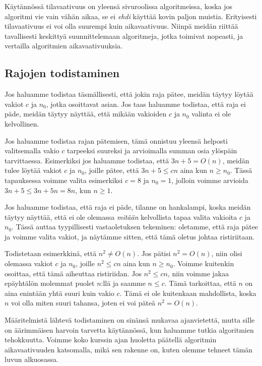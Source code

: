 Käytännössä tilavaativuus on yleensä sivuroolissa algoritmeissa,
koska jos algoritmi vie vain vähän aikaa, se ei \emph{ehdi} käyttää kovin paljon muistia.
Erityisesti tilavaativuus ei voi olla suurempi kuin aikavaativuus.
Niinpä meidän riittää tavallisesti keskittyä suunnittelemaan algoritmeja,
jotka toimivat nopeasti, ja vertailla algoritmien aikavaativuuksia.

\subsection{Rajojen todistaminen}

Jos haluamme todistaa täsmällisesti, että jokin raja pätee,
meidän täytyy löytää vakiot $c$ ja $n_0$, jotka osoittavat asian.
Jos taas haluamme todistaa, että raja ei päde,
meidän täytyy näyttää, että mikään vakioiden $c$ ja $n_0$ valinta ei ole kelvollinen.

Jos haluamme todistaa rajan pätemisen,
tämä onnistuu yleensä helposti valitsemalla vakio $c$
tarpeeksi suureksi ja arvioimalla summan osia ylöspäin tarvittaessa.
Esimerkiksi jos haluamme todistaa, että $3n+5 = O(n)$, meidän tulee löytää
vakiot $c$ ja $n_0$, joille pätee, että $3n+5 \le cn$ aina kun $n \ge n_0$.
Tässä tapauksessa voimme valita esimerkiksi $c=8$ ja $n_0=1$,
jolloin voimme arvioida $3n+5 \le 3n+5n=8n$, kun $n \ge 1$.

Jos haluamme todistaa, että raja ei päde, tilanne on hankalampi,
koska meidän täytyy näyttää, että ei ole olemassa \emph{mitään} kelvollista
tapaa valita vakioita $c$ ja $n_0$.
Tässä auttaa tyypillisesti vastaoletuksen tekeminen: oletamme,
että raja pätee ja voimme valita vakiot,
ja näytämme sitten, että tämä oletus johtaa ristiriitaan.

Todistetaan esimerkkinä, että $n^2 \neq O(n)$.
Jos pätisi $n^2=O(n)$, niin olisi olemassa vakiot $c$ ja $n_0$,
joille $n^2 \le cn$ aina kun $n \ge n_0$.
Voimme kuitenkin osoittaa, että tämä aiheuttaa ristiriidan.
Jos $n^2 \le cn$, niin voimme jakaa epäyhtälön molemmat puolet $n$:llä
ja saamme $n \le c$.
Tämä tarkoittaa, että $n$ on aina enintään yhtä suuri kuin vakio $c$.
Tämä ei ole kuitenkaan mahdollista, koska $n$ voi olla miten
suuri tahansa, joten ei voi päteä $n^2 = O(n)$.

Määritelmistä lähtevä todistaminen on sinänsä mukavaa ajanvietettä,
mutta sille on äärimmäisen harvoin tarvetta käytännössä,
kun haluamme tutkia algoritmien tehokkuutta.
Voimme koko kurssin ajan huoletta päätellä algoritmin aikavaativuuden
katsomalla, mikä sen rakenne on, kuten olemme tehneet tämän luvun alkuosassa.
